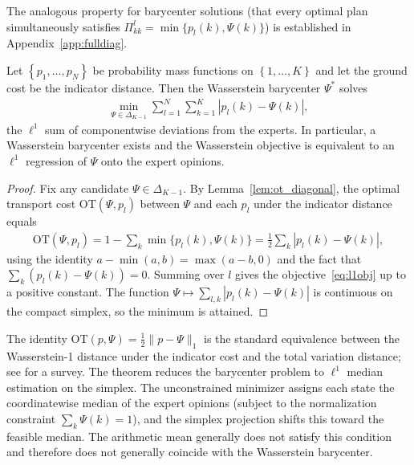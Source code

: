 The analogous property for barycenter solutions (that every optimal plan simultaneously satisfies $\Pi^{l}_{kk} = \min\{p_l(k), \Psi(k)\}$) is established in Appendix~\ref{app:fulldiag}.
\begin{theorem}
\label{thm:l1}
Let $\left\{p_1,\ldots,p_N\right\}$ be probability mass functions on $\left\{1,\ldots,K\right\}$ and let the ground cost be the indicator distance.  Then the Wasserstein barycenter $\Psi^*$ solves
\begin{align}
\label{eq:l1obj}
\min_{\Psi \in \Delta_{K-1}} \sum_{l=1}^N \sum_{k=1}^K \left| p_l(k) - \Psi(k) \right|,
\end{align}
the $\ell^1$ sum of componentwise deviations from the experts.  In particular, a Wasserstein barycenter exists and the Wasserstein objective is equivalent to an $\ell^1$ regression of $\Psi$ onto the expert opinions.
\end{theorem}
\begin{proof}
Fix any candidate $\Psi \in \Delta_{K-1}$.  By Lemma~\ref{lem:ot_diagonal}, the optimal transport cost $\mathrm{OT}(\Psi, p_l)$ between $\Psi$ and each $p_l$ under the indicator distance equals
\begin{align*}
\mathrm{OT}(\Psi, p_l) = 1 - \sum_k \min\{p_l(k), \Psi(k)\}
= \tfrac{1}{2}\sum_k |p_l(k) - \Psi(k)|,
\end{align*}
using the identity $a - \min(a,b) = \max(a-b,0)$ and the fact that $\sum_k(p_l(k)-\Psi(k))=0$.  Summing over $l$ gives the objective~\eqref{eq:l1obj} up to a positive constant.  The function $\Psi \mapsto \sum_{l,k}|p_l(k)-\Psi(k)|$ is continuous on the compact simplex, so the minimum is attained.
\end{proof}
\begin{remark}
The identity $\mathrm{OT}(p,\Psi) = \tfrac{1}{2}\|p-\Psi\|_1$ is the standard equivalence between the Wasserstein-1 distance under the indicator cost and the total variation distance; see \cite{panaretos19} for a survey.  The theorem reduces the barycenter problem to $\ell^1$ median estimation on the simplex. The unconstrained minimizer assigns each state the coordinatewise median of the expert opinions (subject to the normalization constraint $\sum_k\Psi(k)=1$), and the simplex projection shifts this toward the feasible median.  The arithmetic mean generally does not satisfy this condition and therefore does not generally coincide with the Wasserstein barycenter.
\end{remark}

